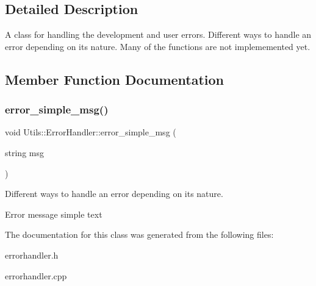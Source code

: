 \subsection{Detailed Description}
A class for handling the development and user errors. Different ways to handle an error depending on its nature. Many of the functions are not implememented yet. 

\subsection{Member Function Documentation}
\mbox{\label{classUtils_1_1ErrorHandler_a8b2b06323fcdb8e996104ff33cfc6840}} 
\subsubsection{\texorpdfstring{error\+\_\+simple\+\_\+msg()}{error\_simple\_msg()}}
{\footnotesize\ttfamily void Utils\+::\+Error\+Handler\+::error\+\_\+simple\+\_\+msg (\begin{DoxyParamCaption}\item[{string}]{msg }\end{DoxyParamCaption})}



Different ways to handle an error depending on its nature. 

Error message simple text 

The documentation for this class was generated from the following files\+:\begin{DoxyCompactItemize}
\item 
errorhandler.\+h\item 
errorhandler.\+cpp\end{DoxyCompactItemize}
